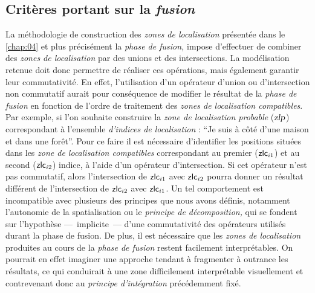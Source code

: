 %   

\subsection{Critères portant sur la \emph{fusion}}

La méthodologie de construction des \emph{zones de localisation}
présentée dans le \autoref{chap:04} et plus précisément la \emph{phase
  de fusion,} impose d'effectuer de combiner des \emph{zones de
  localisation} par des unions et des intersections. La modélisation
retenue doit donc permettre de réaliser ces opérations, mais également
garantir leur commutativité. En effet, l'utilisation d'un opérateur
d'union ou d'intersection non commutatif aurait pour conséquence de
modifier le résultat de la \emph{phase de fusion} en fonction de
l'ordre de traitement des \emph{zones de localisation
  compatibles}. Par exemple, si l'on souhaite construire la \emph{zone
  de localisation probable} ($\text{\textsl{zlp}}$) correspondant à
l'ensemble \emph{d'indices de localisation} : \enquote{Je suis à côté
  d'une maison et dans une forêt}. Pour ce faire il est nécessaire
d'identifier les positions situées dans les \emph{zone de localisation
  compatibles} correspondant au premier ($\text{\textsf{zlc}}_{i1}$)
et au second ($\text{\textsf{zlc}}_{i2}$) indice, à l'aide d'un
opérateur d'intersection. Si cet opérateur n'est pas commutatif, alors
l'intersection de $\text{\textsf{zlc}}_{i1}$ avec
$\text{\textsf{zlc}}_{i2}$ pourra donner un résultat différent de
l'intersection de $\text{\textsf{zlc}}_{i2}$ avec
$\text{\textsf{zlc}}_{i1}$. Un tel comportement est incompatible avec
plusieurs des principes que nous avons définis, notamment l'autonomie
de la spatialisation ou le \emph{principe de décomposition,} qui se
fondent sur l'hypothèse ---~implicite~--- d'une commutativité des
opérateurs utilisés durant la phase de fusion. De plus, il est
nécessaire que les \emph{zones de localisation} produites au cours de
la \emph{phase de fusion} restent facilement interprétables. On
pourrait en effet imaginer une approche tendant à fragmenter à
outrance les résultats, ce qui conduirait à une zone difficilement
interprétable visuellement et contrevenant donc au \emph{principe
  d'intégration} précédemment fixé.


